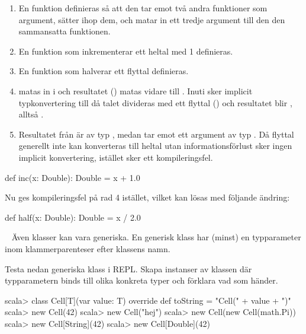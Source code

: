 \SubtaskSolved   \begin{enumerate}
\item En funktion definieras så att den tar emot två andra funktioner som argument, sätter ihop dem, och matar in ett tredje argument till den den sammansatta funktionen.
\item En funktion som inkrementerar ett heltal med 1 definieras.
\item En funktion som halverar ett flyttal definieras.
\item {} matas in i  och resultatet () matas vidare till . Inuti  sker implicit typkonvertering till  då talet divideras med ett flyttal () och resultatet blir , alltså .
\item Resultatet från  är av typ , medan  tar emot ett argument av typ . Då flyttal generellt inte kan konverteras till heltal utan informationsförlust sker ingen implicit konvertering, istället sker ett kompileringsfel.
\end{enumerate}

\SubtaskSolved  \begin{Code}
def inc(x: Double): Double = x + 1.0
\end{Code}
Nu ges kompileringsfel på rad 4 istället, vilket kan lösas med följande ändring:
\begin{Code}
def half(x: Double): Double = x / 2.0
\end{Code}

\QUESTEND





\QUESTBEGIN

\Task  \what~  Även klasser kan vara generiska. En generisk klass har (minst) en typparameter inom klammerparenteser efter klassens namn.

\Subtask Testa nedan generiska klass  i REPL. Skapa instanser av klassen  där typparametern  binds till olika konkreta typer och förklara vad som händer.

\begin{REPL}
scala> class Cell[T](var value: T){
         override def toString = "Cell(" + value + ")"
       }
scala> new Cell(42)
scala> new Cell("hej")
scala> new Cell(new Cell(math.Pi))
scala> new Cell[String](42)
scala> new Cell[Double](42)
\end{REPL}

